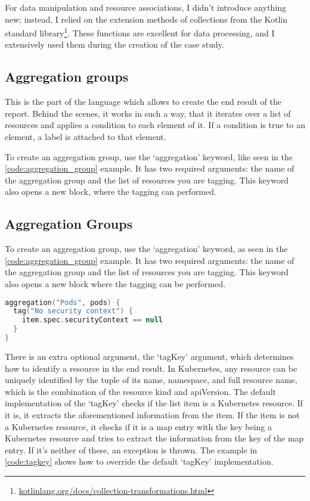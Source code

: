 For data manipulation and resource associations, I didn't introduce anything new; instead, I relied on the extension methods of collections from the Kotlin standard library\footnote{\url{kotlinlang.org/docs/collection-transformations.html}}. These functions are excellent for data processing, and I extensively used them during the creation of the case study.

\subsection{Aggregation groups}

This is the part of the language which allows to create the end result of the report. Behind the scenes, it works in such a way, that it iterates over a list of resources and applies a condition to each element of it. If a condition is true to an element, a label is attached to that element.

To create an aggregation group, use the `aggregation' keyword, like seen in the \ref{code:aggregation_group} example. It has two required arguments: the name of the aggregation group and the list of resources you are tagging. This keyword also opens a new block, where the tagging can performed.

\subsection{Aggregation Groups}

To create an aggregation group, use the `aggregation' keyword, as seen in the \ref{code:aggregation_group} example. It has two required arguments: the name of the aggregation group and the list of resources you are tagging. This keyword also opens a new block where the tagging can be performed.

\begin{minipage}{\linewidth}
\begin{lstlisting}[caption={Aggregation group example},language=Kotlin,label=code:aggregation_group]
aggregation("Pods", pods) {
  tag("No security context") {
    item.spec.securityContext == null
  }
}
\end{lstlisting}
\end{minipage}

There is an extra optional argument, the `tagKey' argument, which determines how to identify a resource in the end result. In Kubernetes, any resource can be uniquely identified by the tuple of its name, namespace, and full resource name, which is the combination of the resource kind and apiVersion. The default implementation of the `tagKey' checks if the list item is a Kubernetes resource. If it is, it extracts the aforementioned information from the item. If the item is not a Kubernetes resource, it checks if it is a map entry with the key being a Kubernetes resource and tries to extract the information from the key of the map entry. If it's neither of these, an exception is thrown. The example in \ref{code:tagkey} shows how to override the default `tagKey' implementation.

